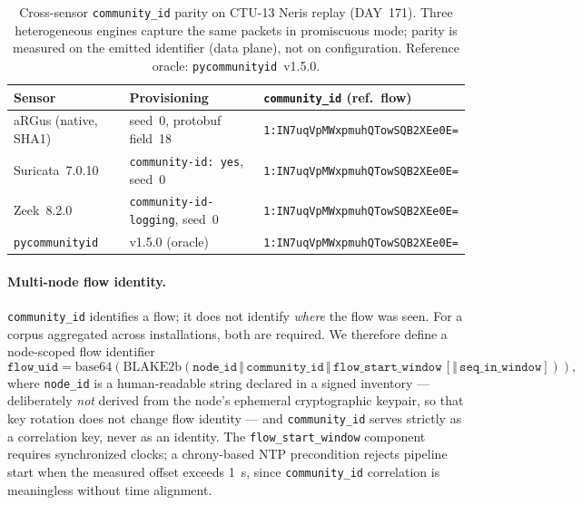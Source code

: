 \documentclass[11pt,a4paper]{article}
\begin{document}
    \begin{table}[h]
        \centering
        \caption{Cross-sensor \texttt{community\_id} parity on CTU-13 Neris replay
            (DAY~171). Three heterogeneous engines capture the same packets in promiscuous
            mode; parity is measured on the emitted identifier (data plane), not on
            configuration. Reference oracle: \texttt{pycommunityid}~v1.5.0.}
        \label{tab:parity}
        \begin{tabular}{lll}
            \toprule
            \textbf{Sensor} & \textbf{Provisioning} & \textbf{\texttt{community\_id} (ref.\ flow)} \\
            \midrule
            aRGus (native, SHA1)   & seed~0, protobuf field~18              & \texttt{1:IN7uqVpMWxpmuhQTowSQB2XEe0E=} \\
            Suricata~7.0.10        & \texttt{community-id: yes}, seed~0     & \texttt{1:IN7uqVpMWxpmuhQTowSQB2XEe0E=} \\
            Zeek~8.2.0             & \texttt{community-id-logging}, seed~0  & \texttt{1:IN7uqVpMWxpmuhQTowSQB2XEe0E=} \\
            \texttt{pycommunityid} & v1.5.0 (oracle)                        & \texttt{1:IN7uqVpMWxpmuhQTowSQB2XEe0E=} \\
            \bottomrule
        \end{tabular}
    \end{table}

    \paragraph{Multi-node flow identity.}
    \texttt{community\_id} identifies a flow; it does not identify \emph{where} the flow
    was seen. For a corpus aggregated across installations, both are required. We therefore
    define a node-scoped flow identifier
    \[
        \texttt{flow\_uid} = \mathrm{base64}\!\left(
                                                  \mathrm{BLAKE2b}\!\left(
                                                                        \texttt{node\_id} \,\Vert\, \texttt{community\_id} \,\Vert\,
                                                                        \texttt{flow\_start\_window} \,[\Vert\, \texttt{seq\_in\_window}]
            \right)
        \right),
    \]
    where \texttt{node\_id} is a human-readable string declared in a signed inventory ---
    deliberately \emph{not} derived from the node's ephemeral cryptographic keypair, so
    that key rotation does not change flow identity --- and \texttt{community\_id} serves
    strictly as a correlation key, never as an identity. The \texttt{flow\_start\_window}
    component requires synchronized clocks; a chrony-based NTP precondition rejects
    pipeline start when the measured offset exceeds 1~s, since \texttt{community\_id}
    correlation is meaningless without time alignment.
\end{document}
